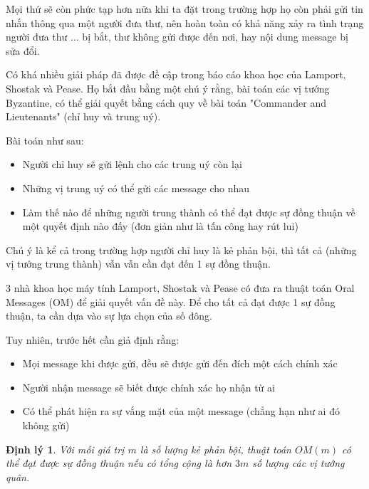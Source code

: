 \documentclass[14pt, a4paper]{article}
\numberwithin{equation}{section}
\numberwithin{figure}{section}
\newtheorem{dl}{Định lý}
\numberwithin{dl}{section}
\numberwithin{md}{section}
\numberwithin{bd}{section}
\numberwithin{dn}{section}
\numberwithin{hq}{section}
\begin{document}
\begin{enumerate}
        Mọi thứ sẽ còn phức tạp hơn nữa khi ta đặt trong trường hợp họ còn phải gửi tin nhắn thông qua một người đưa thư, nên hoàn toàn có khả năng xảy ra tình trạng người đưa thư ... bị bắt, thư không gửi được đến nơi, hay nội dung message bị sửa đổi.

        Có khá nhiều giải pháp đã được đề cập trong báo cáo khoa học của Lamport, Shostak và Pease. Họ bắt đầu bằng một chú ý rằng, bài toán các vị tướng Byzantine, có thể giải quyết bằng cách quy về bài toán "Commander and Lieutenants" (chỉ huy và trung uý).

        Bài toán như sau:

        \begin{itemize}
            \item Người chỉ huy sẽ gửi lệnh cho các trung uý còn lại
            \item Những vị trung uý có thể gửi các message cho nhau
            \item Làm thế nào để những người trung thành có thể đạt được sự đồng thuận về một quyết định nào đấy (đơn giản như là tấn công hay rút lui)
        \end{itemize}

        Chú ý là kể cả trong trường hợp người chỉ huy là kẻ phản bội, thì tất cả (những vị tướng trung thành) vẫn vẫn cần đạt đến 1 sự đồng thuận.

        3 nhà khoa học máy tính Lamport, Shostak và Pease có đưa ra thuật toán Oral Messages (OM) để giải quyết vấn đề này. Để cho tất cả đạt được 1 sự đồng thuận, ta cần dựa vào sự lựa chọn của số đông.

        Tuy nhiên, trước hết cần giả định rằng:

        \begin{itemize}
            \item Mọi message khi được gửi, đều sẽ được gửi đến đích một cách chính xác
            \item Người nhận message sẽ biết được chính xác họ nhận từ ai
            \item Có thể phát hiện ra sự vắng mặt của một message (chẳng hạn như ai đó không gửi)
        \end{itemize}

        \begin{dl}
            Với mỗi giá trị $m$ là số lượng kẻ phản bội, thuật toán $OM(m)$ có thể đạt được sự đồng thuận nếu có tổng cộng là hơn $3m$ số lượng các vị tướng quân.
        \end{dl}


\end{enumerate}
\end{document}

